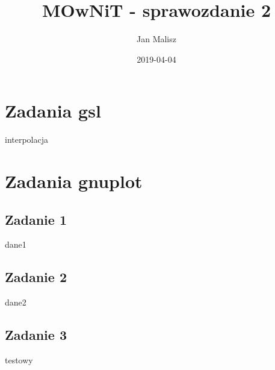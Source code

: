 \documentclass[10pt,a4paper]{article}
\title{MOwNiT - sprawozdanie 2}
\author{Jan Malisz}
\date{2019-04-04}
\begin{document}
  \maketitle
  \thispagestyle{empty}

  \newpage
  \section*{Zadania gsl}\label{sec:ZadaniaGsl}
  {interpolacja}

  \newpage
  \section*{Zadania gnuplot}\label{sec:ZadaniaGnuplot}
  \subsection*{Zadanie 1}\label{sec:Zadanie1}
  {dane1}

  \newpage
  \subsection*{Zadanie 2}\label{sec:Zadanie2}
  {dane2}

  \newpage
  \subsection*{Zadanie 3}\label{sec:Zadanie3}
  {testowy}
\end{document}
